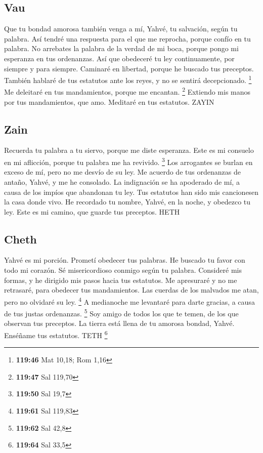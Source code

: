 \begin{paracol}{2}
\hypertarget{vau}{%
\subsection{Vau}\label{vau}}

 Que tu bondad amorosa también venga a mí, Yahvé, tu
salvación, según tu palabra.  Así tendré una respuesta
para el que me reprocha, porque confío en tu palabra.  No
arrebates la palabra de la verdad de mi boca, porque pongo mi esperanza
en tus ordenanzas.  Así que obedeceré tu ley
continuamente, por siempre y para siempre.  Caminaré en
libertad, porque he buscado tus preceptos.  También
hablaré de tus estatutos ante los reyes, y no se sentirá decepcionado.
\footnote{\textbf{119:46} Mat 10,18; Rom 1,16}  Me
deleitaré en tus mandamientos, porque me encantan. \footnote{\textbf{119:47}
  Sal 119,70}  Extiendo mis manos por tus mandamientos,
que amo. Meditaré en tus estatutos. ZAYIN

\hypertarget{zain}{%
\subsection{Zain}\label{zain}}

 Recuerda tu palabra a tu siervo, porque me diste
esperanza.  Este es mi consuelo en mi aflicción, porque
tu palabra me ha revivido. \footnote{\textbf{119:50} Sal 19,7}
 Los arrogantes se burlan en exceso de mí, pero no me
desvío de su ley.  Me acuerdo de tus ordenanzas de
antaño, Yahvé, y me he consolado.  La indignación se ha
apoderado de mí, a causa de los impíos que abandonan tu ley.
 Tus estatutos han sido mis cancionesen la casa donde
vivo.  He recordado tu nombre, Yahvé, en la noche, y
obedezco tu ley.  Este es mi camino, que guarde tus
preceptos. HETH

\hypertarget{cheth}{%
\subsection{Cheth}\label{cheth}}

 Yahvé es mi porción. Prometí obedecer tus palabras.
 He buscado tu favor con todo mi corazón. Sé
misericordioso conmigo según tu palabra.  Consideré mis
formas, y he dirigido mis pasos hacia tus estatutos.  Me
apresuraré y no me retrasaré, para obedecer tus mandamientos.
 Las cuerdas de los malvados me atan, pero no olvidaré su
ley. \footnote{\textbf{119:61} Sal 119,83}  A medianoche
me levantaré para darte gracias, a causa de tus justas ordenanzas.
\footnote{\textbf{119:62} Sal 42,8}  Soy amigo de todos
los que te temen, de los que observan tus preceptos.  La
tierra está llena de tu amorosa bondad, Yahvé. Enséñame tus estatutos.
TETH \footnote{\textbf{119:64} Sal 33,5}


\end{paracol}
